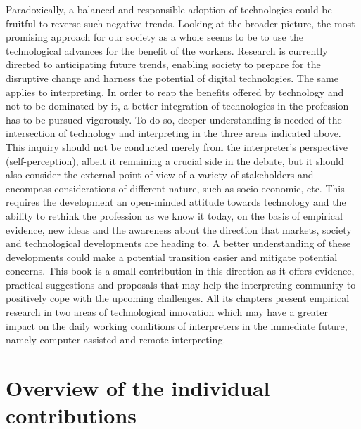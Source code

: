 \documentclass[output=paper]{langsci/langscibook}
\begin{document}
Paradoxically, a balanced and responsible adoption of technologies could be fruitful to reverse such negative trends. Looking at the broader picture, the most promising approach for our society as a whole seems to be to use the technological advances for the benefit of the workers. Research is currently directed to anticipating future trends, enabling society to prepare for the disruptive change and harness the potential of digital technologies. The same applies to interpreting. In order to reap the benefits offered by technology and not to be dominated by it, a better integration of technologies in the profession has to be pursued vigorously. To do so, deeper understanding is needed of the intersection of technology and interpreting in the three areas indicated above. This inquiry should not be conducted merely from the interpreter’s perspective (self-perception), albeit it remaining a crucial side in the debate, but it should also consider the external point of view of a variety of stakeholders and encompass considerations of different nature, such as socio-economic, etc. This requires the development an open-minded attitude towards technology and the ability to rethink the profession as we know it today, on the basis of empirical evidence, new ideas and the awareness about the direction that markets, society and technological developments are heading to. A better understanding of these developments could make a potential transition easier and mitigate potential concerns. 
This book is a small contribution in this direction as it offers evidence, practical suggestions and proposals that may help the interpreting community to positively cope with the upcoming challenges. All its chapters present empirical research in two areas of technological innovation which may have a greater impact on the daily working conditions of interpreters in the immediate future, namely computer-assisted and remote interpreting. 
 
\section{Overview of the individual contributions} 
 
\end{document}
